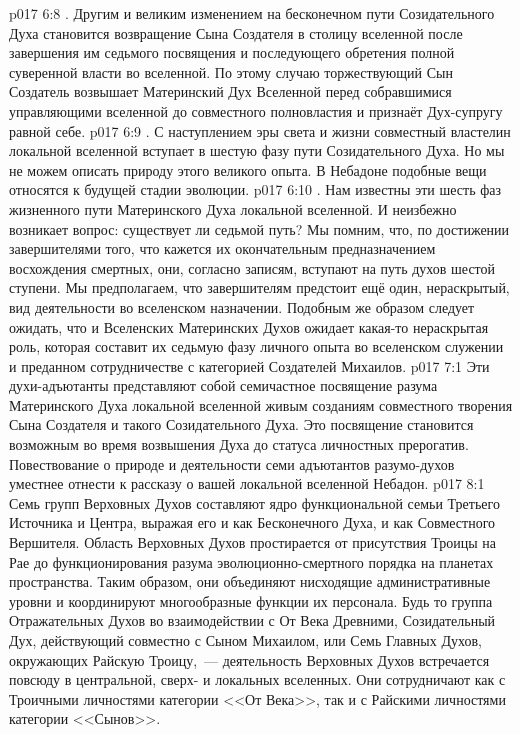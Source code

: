 \vs p017 6:8 . Другим и великим изменением на бесконечном пути Созидательного Духа становится возвращение Сына Создателя в столицу вселенной после завершения им седьмого посвящения и последующего обретения полной суверенной власти во вселенной. По этому случаю торжествующий Сын Создатель возвышает Материнский Дух Вселенной перед собравшимися управляющими вселенной до совместного полновластия и признаёт Дух\hyp{}супругу равной себе.
\vs p017 6:9 . С наступлением эры света и жизни совместный властелин локальной вселенной вступает в шестую фазу пути Созидательного Духа. Но мы не можем описать природу этого великого опыта. В Небадоне подобные вещи относятся к будущей стадии эволюции.
\vs p017 6:10 . Нам известны эти шесть фаз жизненного пути Материнского Духа локальной вселенной. И неизбежно возникает вопрос: существует ли седьмой путь? Мы помним, что, по достижении завершителями того, что кажется их окончательным предназначением восхождения смертных, они, согласно записям, вступают на путь духов шестой ступени. Мы предполагаем, что завершителям предстоит ещё один, нераскрытый, вид деятельности во вселенском назначении. Подобным же образом следует ожидать, что и Вселенских Материнских Духов ожидает какая\hyp{}то нераскрытая роль, которая составит их седьмую фазу личного опыта во вселенском служении и преданном сотрудничестве с категорией Создателей Михаилов.
\vs p017 7:1 Эти духи\hyp{}адъютанты представляют собой семичастное посвящение разума Материнского Духа локальной вселенной живым созданиям совместного творения Сына Создателя и такого Созидательного Духа. Это посвящение становится возможным во время возвышения Духа до статуса личностных прерогатив. Повествование о природе и деятельности семи адъютантов разумо\hyp{}духов уместнее отнести к рассказу о вашей локальной вселенной Небадон.
\vs p017 8:1 Семь групп Верховных Духов составляют ядро функциональной семьи Третьего Источника и Центра, выражая его и как Бесконечного Духа, и как Совместного Вершителя. Область Верховных Духов простирается от присутствия Троицы на Рае до функционирования разума эволюционно\hyp{}смертного порядка на планетах пространства. Таким образом, они объединяют нисходящие административные уровни и координируют многообразные функции их персонала. Будь то группа Отражательных Духов во взаимодействии с От Века Древними, Созидательный Дух, действующий совместно с Сыном Михаилом, или Семь Главных Духов, окружающих Райскую Троицу,~--- деятельность Верховных Духов встречается повсюду в центральной, сверх\hyp{} и локальных вселенных. Они сотрудничают как с Троичными личностями категории <<От Века>>, так и с Райскими личностями категории <<Сынов>>.
